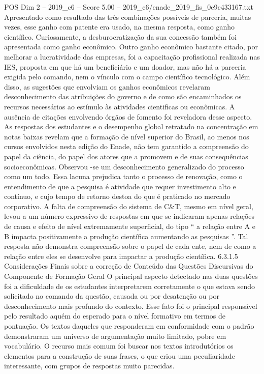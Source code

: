 \begin{textsample}{POS Dim 2 – 2019\_c6 – Score 5.00 – 2019\_c6/enade\_2019\_fis\_0e9c433167.txt}
Apresentado como resultado das três combinações possíveis de parceria, muitas vezes, esse ganho com patente era usado, na mesma resposta, como ganho científico.
Curiosamente, a desburocratização da sua concessão também foi apresentada como ganho econômico.
Outro ganho econômico bastante citado, por melhorar a lucratividade das empresas, foi a capacitação profissional realizada nas IES, proposta em que há um beneficiário e um doador, mas não há a parceria exigida pelo comando, nem o vínculo com o campo científico tecnológico.
Além disso, as sugestões que envolviam os ganhos econômicos revelaram desconhecimento das atribuições do governo e de como são encaminhados os recursos necessários ao estímulo às atividades cientificas ou econômicas.
A ausência de citações envolvendo órgãos de fomento foi reveladora desse aspecto.
As respostas dos estudantes e o desempenho global retratado na concentração em notas baixas revelam que a formação de nível superior do Brasil, ao menos nos cursos envolvidos nesta edição do Enade, não tem garantido a compreensão do papel da ciência, do papel dos atores que a promovem e de suas consequências socioeconômicas.
Observou -se um desconhecimento generalizado do processo como um todo.
Essa lacuna prejudica tanto o processo de renovação, como o entendimento de que a pesquisa é atividade que requer investimento alto e contínuo, e cujo tempo de retorno destoa do que é praticado no mercado corporativo.
A falta de compreensão do sistema de C\&T, mesmo em nível geral, levou a um número expressivo de respostas em que se indicaram apenas relações de causa e efeito de nível extremamente superficial, do tipo “ a relação entre A e B impacta positivamente a produção científica aumentando as pesquisas ”.
Tal resposta não demonstra compreensão sobre o papel de cada ente, nem de como a relação entre eles se desenvolve para impactar a produção científica. 6.3.1.5 Considerações Finais sobre a correção de Conteúdo das Questões Discursivas do Componente de Formação Geral O principal aspecto detectado nas duas questões foi a dificuldade de os estudantes interpretarem corretamente o que estava sendo solicitado no comando da questão, causada ou por desatenção ou por desconhecimento mais profundo do contexto.
Esse fato foi o principal responsável pelo resultado aquém do esperado para o nível formativo em termos de pontuação.
Os textos daqueles que responderam em conformidade com o padrão demonstraram um universo de argumentação muito limitado, pobre em vocabulário.
O recurso mais comum foi buscar nos textos introdutórios os elementos para a construção de suas frases, o que criou uma peculiaridade interessante, com grupos de respostas muito parecidas.

\end{textsample}
